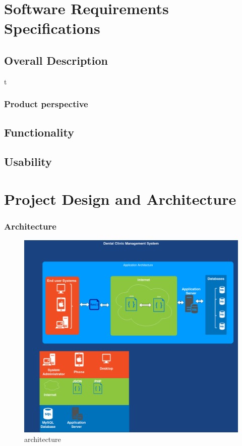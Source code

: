 \documentclass[12pt]{article}
\begin{document}
\section{Software Requirements Specifications}
\subsection{Overall Description}t
\subsubsection{Product perspective}

\subsection{Functionality}
\subsection{Usability}
\newpage   
\section{Project Design and Architecture}
 
    \subsubsection{Architecture}
    
    \begin{figure}[h]
    \centering
    
    \includegraphics[width=\linewidth]{architecture.png}
    \caption{architecture}
    \end{figure}
    \newpage
\end{document}
